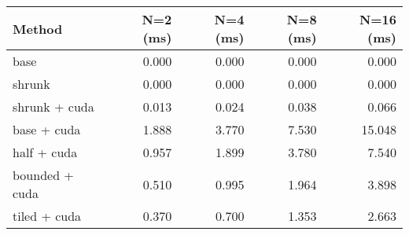\begin{tabular}{lrrrr}
\hline
 Method         &   N=2 (ms) &   N=4 (ms) &   N=8 (ms) &   N=16 (ms) \\
\hline
 base           &      0.000 &      0.000 &      0.000 &       0.000 \\
 shrunk         &      0.000 &      0.000 &      0.000 &       0.000 \\
 shrunk + cuda  &      0.013 &      0.024 &      0.038 &       0.066 \\
 base + cuda    &      1.888 &      3.770 &      7.530 &      15.048 \\
 half + cuda    &      0.957 &      1.899 &      3.780 &       7.540 \\
 bounded + cuda &      0.510 &      0.995 &      1.964 &       3.898 \\
 tiled + cuda   &      0.370 &      0.700 &      1.353 &       2.663 \\
\hline
\end{tabular}
